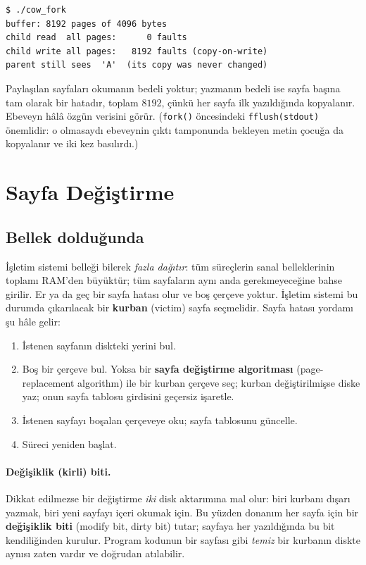 \documentclass[11pt,a4paper]{article}
\newcommand{\term}[1]{\textbf{\color{mintdeep}#1}}
\newcommand{\cmd}[1]{\texttt{#1}}
\begin{document}


\begin{lstlisting}[style=term]
$ ./cow_fork
buffer: 8192 pages of 4096 bytes
child read  all pages:      0 faults
child write all pages:   8192 faults (copy-on-write)
parent still sees  'A'  (its copy was never changed)
\end{lstlisting}

Paylaşılan sayfaları okumanın bedeli yoktur; yazmanın bedeli ise sayfa başına tam olarak bir hatadır, toplam $8192$, çünkü her sayfa ilk yazıldığında kopyalanır. Ebeveyn hâlâ özgün verisini görür. (\cmd{fork()} öncesindeki \cmd{fflush(stdout)} önemlidir: o olmasaydı ebeveynin çıktı tamponunda bekleyen metin çocuğa da kopyalanır ve iki kez basılırdı.)

\section{Sayfa Değiştirme}
\label{sec:repl}

\subsection{Bellek dolduğunda}

İşletim sistemi belleği bilerek \emph{fazla dağıtır}: tüm süreçlerin sanal belleklerinin toplamı RAM'den büyüktür; tüm sayfaların aynı anda gerekmeyeceğine bahse girilir. Er ya da geç bir sayfa hatası olur ve boş çerçeve yoktur. İşletim sistemi bu durumda çıkarılacak bir \term{kurban} (victim) sayfa seçmelidir. Sayfa hatası yordamı şu hâle gelir:

\begin{enumerate}[leftmargin=1.4em]
  \item İstenen sayfanın diskteki yerini bul.
  \item Boş bir çerçeve bul. Yoksa bir \term{sayfa değiştirme algoritması} (page-replacement algorithm) ile bir kurban çerçeve seç; kurban değiştirilmişse diske yaz; onun sayfa tablosu girdisini geçersiz işaretle.
  \item İstenen sayfayı boşalan çerçeveye oku; sayfa tablosunu güncelle.
  \item Süreci yeniden başlat.
\end{enumerate}

\paragraph{Değişiklik (kirli) biti.} Dikkat edilmezse bir değiştirme \emph{iki} disk aktarımına mal olur: biri kurbanı dışarı yazmak, biri yeni sayfayı içeri okumak için. Bu yüzden donanım her sayfa için bir \term{değişiklik biti} (modify bit, dirty bit) tutar; sayfaya her yazıldığında bu bit kendiliğinden kurulur. Program kodunun bir sayfası gibi \emph{temiz} bir kurbanın diskte aynısı zaten vardır ve doğrudan atılabilir.
\end{document}

